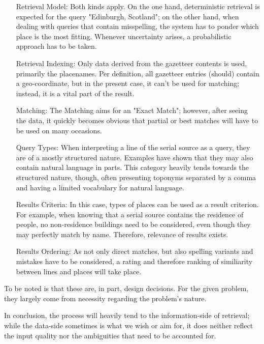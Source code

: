 \documentclass[11pt]{article}
\begin{document}
\begin{itemize}
\item [Retrieval Model:] Both kinds apply. On the one hand, deterministic retrieval is expected for the query "Edinburgh, Scotland"; on the other hand, when dealing with queries that contain misspelling, the system has to ponder which place is the most fitting. Whenever uncertainty arises, a probabilistic approach has to be taken.
\item [Retrieval Indexing:] Only data derived from the gazetteer contents is used, primarily the placenames. Per definition, all gazetteer entries (should) contain a geo-coordinate, but in the present case, it can't be used for matching; instead, it is a vital part of the result.
\item [Matching:] The Matching aims for an "Exact Match"; however, after seeing the data, it quickly becomes obvious that partial or best matches will have to be used on many occasions.
\item [Query Types:] When interpreting a line of the serial source as a query, they are of a mostly structured nature. Examples have shown that they may also contain natural language in parts. This category heavily tends towards the structured nature, though, often presenting toponyms separated by a comma and having a limited vocabulary for natural language.
\item [Results Criteria:] In this case, types of places can be used as a result criterion. For example, when knowing that a serial source contains the residence of people, no non-residence buildings need to be considered, even though they may perfectly match by name. Therefore, relevance of results exists.
\item [Results Ordering:] As not only direct matches, but also spelling variants and mistakes have to be considered, a rating and therefore ranking of similiarity between lines and places will take place.
\end{itemize}

To be noted is that these are, in part, design decisions. For the given problem, they largely come from necessity regarding the problem's nature.

In conclusion, the process will heavily tend to the information-side of retrieval; while the data-side sometimes is what we wish or aim for, it does neither reflect the input quality nor the ambiguities that need to be accounted for.

\end{document}
